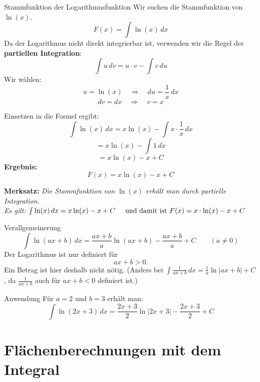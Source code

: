          \begin{b8d}{Stammfunktion der Logarithmusfunktion}{}
   Wir suchen die Stammfunktion von $\ln(x)$.
$$
F(x) = \int \ln(x)\,dx
$$
Da der Logarithmus nicht direkt integrierbar ist, verwenden wir die Regel der \textbf{partiellen Integration}:
$$
\int u\,dv = u\cdot v - \int v\,du
$$
Wir wählen:
$$
u = \ln(x) \quad \Rightarrow \quad du = \frac{1}{x}\,dx
$$
$$
dv = dx \quad \Rightarrow \quad v = x
$$

Einsetzen in die Formel ergibt:
$$
\int \ln(x)\,dx = x\ln(x) - \int x \cdot \frac{1}{x}\,dx
$$
$$
= x\ln(x) - \int 1\,dx
$$
$$
= x\ln(x) - x + C
$$
\textbf{Ergebnis:}
$$
F(x) = x\ln(x) - x + C
$$

\bigskip
\textbf{Merksatz:}
\emph{Die Stammfunktion von $\ln(x)$ erhält man durch partielle Integration. \\ 
Es gilt:}
$\int \ln(x)\,dx = x\ln(x) - x + C \hspace{0.5cm} \text{und damit ist }
F(x) = x\cdot\ln(x) - x + C$ 
\end{b8d}
\begin{merke}{Verallgemeinerung}{}
    \[
\int \ln(ax+b)\,dx
= \frac{ax+b}{a}\ln(ax+b)
-\frac{ax+b}{a}
+ C
\qquad (a\neq 0)
\]
Der Logarithmus ist nur definiert für
\[
ax+b > 0.
\]
Ein Betrag ist hier deshalb nicht nötig. (Anders bei \(\int \frac{1}{ax+b}\,dx = \frac{1}{a}\ln|ax+b| + C\), da \(\frac{1}{ax+b}\) auch für \(ax+b<0\) definiert ist.)
\end{merke}
\begin{bsp}{Anwendung}{}
   Für \(a=2\) und \(b=3\) erhält man:
\[
\int \ln(2x+3)\,dx
=
\frac{2x+3}{2}\ln\!\bigl|2x+3\bigr|
-\frac{2x+3}{2}
+ C
\] 
\end{bsp}

\section{Flächenberechnungen mit dem Integral}
